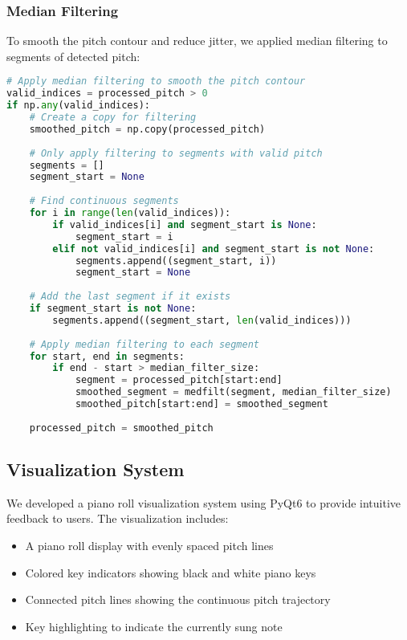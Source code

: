 \documentclass[conference]{IEEEtran}
\begin{document}
\subsubsection{Median Filtering}
To smooth the pitch contour and reduce jitter, we applied median filtering to segments of detected pitch:

\begin{lstlisting}[language=Python]
# Apply median filtering to smooth the pitch contour
valid_indices = processed_pitch > 0
if np.any(valid_indices):
    # Create a copy for filtering
    smoothed_pitch = np.copy(processed_pitch)
    
    # Only apply filtering to segments with valid pitch
    segments = []
    segment_start = None
    
    # Find continuous segments
    for i in range(len(valid_indices)):
        if valid_indices[i] and segment_start is None:
            segment_start = i
        elif not valid_indices[i] and segment_start is not None:
            segments.append((segment_start, i))
            segment_start = None
    
    # Add the last segment if it exists
    if segment_start is not None:
        segments.append((segment_start, len(valid_indices)))
    
    # Apply median filtering to each segment
    for start, end in segments:
        if end - start > median_filter_size:
            segment = processed_pitch[start:end]
            smoothed_segment = medfilt(segment, median_filter_size)
            smoothed_pitch[start:end] = smoothed_segment
    
    processed_pitch = smoothed_pitch
\end{lstlisting}

\subsection{Visualization System}
We developed a piano roll visualization system using PyQt6 to provide intuitive feedback to users. The visualization includes:

\begin{itemize}
    \item A piano roll display with evenly spaced pitch lines
    \item Colored key indicators showing black and white piano keys
    \item Connected pitch lines showing the continuous pitch trajectory
    \item Key highlighting to indicate the currently sung note
\end{itemize}
\end{document}
